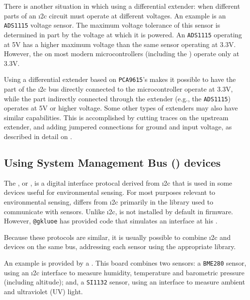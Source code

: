 \begin{kaobox}[frametitle=Potential for change \dots]
There is another situation in which using a differential extender: when different parts of an \i2c circuit must operate at different voltages.
An example is an \texttt{ADS1115} voltage sensor.
The maximum voltage tolerance of this sensor is determined in part by the voltage at which it is powered.
An \texttt{ADS1115} operating at 5V has a higher maximum voltage than the same sensor operating at 3.3V.
However, the \gpios on most modern microcontrollers (including the ) operate only at 3.3V.

Using a differential extender based on \texttt{PCA9615}'s makes it possible to have the part of the \i2c bus directly connected to the microcontroller operate at 3.3V, while the part indirectly connected through the extender (e.g., the \texttt{ADS1115}) operates at 5V or higher voltage.
Some other types of extenders may also have similar capabilities.
This is accomplished by cutting traces on the upstream extender, and adding jumpered connections for ground and input voltage, as described in detail on .
\end{kaobox}



\subsection{Using System Management Bus (\smbus) devices}
The , or \smbus, is a digital interface protocal derived from \i2c that is used in some devices useful for environmental sensing.
For most purposes relevant to environmental sensing, \smbus differs from \i2c primarily in the \Micropython library used to communicate with sensors.
Unlike \i2c, \smbus is not installed by default in \Micropython firmware.
However, \verb|@gkluoe| has provided code that simulates an \smbus interface at his .

Because these protocols are similar, it is usually possible to combine \i2c and \smbus devices on the same bus, addressing each sensor using the appropriate library.

An example is provided by a .
This board combines two sensors: a \texttt{BME280} sensor, using an \i2c interface to measure humidity, temperature and barometric pressure (including altitude); and, a \texttt{SI1132} sensor, using an \smbus interface to measure ambient and ultraviolet (UV) light.

